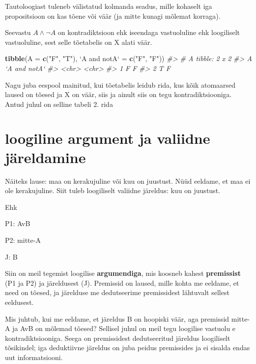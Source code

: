 \documentclass[]{book}
\newenvironment{Shaded}{\begin{snugshade}}{\end{snugshade}}
\newcommand{\KeywordTok}[1]{\textcolor[rgb]{0.13,0.29,0.53}{\textbf{#1}}}
\newcommand{\DataTypeTok}[1]{\textcolor[rgb]{0.13,0.29,0.53}{#1}}
\newcommand{\StringTok}[1]{\textcolor[rgb]{0.31,0.60,0.02}{#1}}
\newcommand{\CommentTok}[1]{\textcolor[rgb]{0.56,0.35,0.01}{\textit{#1}}}
\newcommand{\NormalTok}[1]{#1}
\begin{document}
Tautoloogiast tuleneb välistatud kolmanda seadus, mille kohaselt iga
propositsioon on kas tõene või väär (ja mitte kunagi mõlemat korraga).

Seevastu \(A \land \neg A\) on kontradiktsioon ehk iseendaga
vastuoluline ehk loogiliselt vastuoluline, sest selle tõetabelis on X
alati väär.

\begin{Shaded}
\begin{Highlighting}[]
\KeywordTok{tibble}\NormalTok{(}\DataTypeTok{A =} \KeywordTok{c}\NormalTok{(}\StringTok{"F"}\NormalTok{, }\StringTok{"T"}\NormalTok{), }\StringTok{`}\DataTypeTok{A and notA}\StringTok{`}\NormalTok{ =}\StringTok{ }\KeywordTok{c}\NormalTok{(}\StringTok{"F"}\NormalTok{, }\StringTok{"F"}\NormalTok{))}
\CommentTok{#> # A tibble: 2 x 2}
\CommentTok{#>   A     `A and notA`}
\CommentTok{#>   <chr> <chr>       }
\CommentTok{#> 1 F     F           }
\CommentTok{#> 2 T     F}
\end{Highlighting}
\end{Shaded}

Nagu juba eespool mainitud, kui tõetabelis leidub rida, kus kõik
atomaarsed laused on tõesed ja X on väär, siis ja ainult siis on tegu
kontradiktsiooniga. Antud juhul on selline tabeli 2. rida

\section{loogiline argument ja valiidne
järeldamine}\label{loogiline-argument-ja-valiidne-jareldamine}

Näiteks lause: maa on kerakujuline või kuu on juustust. Nüüd eeldame, et
maa ei ole kerakujuline. Siit tuleb loogiliselt valiidne järeldus: kuu
on juustust.

Ehk

P1: AvB

P2: mitte-A

J: B

Siin on meil tegemist loogilise \textbf{argumendiga}, mis koosneb kahest
\textbf{premissist} (P1 ja P2) ja järeldusest (J). Premissid on laused,
mille kohta me eeldame, et need on tõesed, ja järelduse me dedutseerime
premissidest lähtuvalt sellest eeldusest.

Mis juhtub, kui me eeldame, et järeldus B on hoopiski väär, aga
premissid mitte-A ja AvB on mõlemad tõesed? Sellisel juhul on meil tegu
loogilise vastuolu e kontradiktsiooniga. Seega on premissidest
dedutseeritud järeldus loogiliselt tõsikindel; iga deduktiivne järeldus
on juba peidus premissides ja ei sisalda endas uut informatsiooni.
\end{document}
